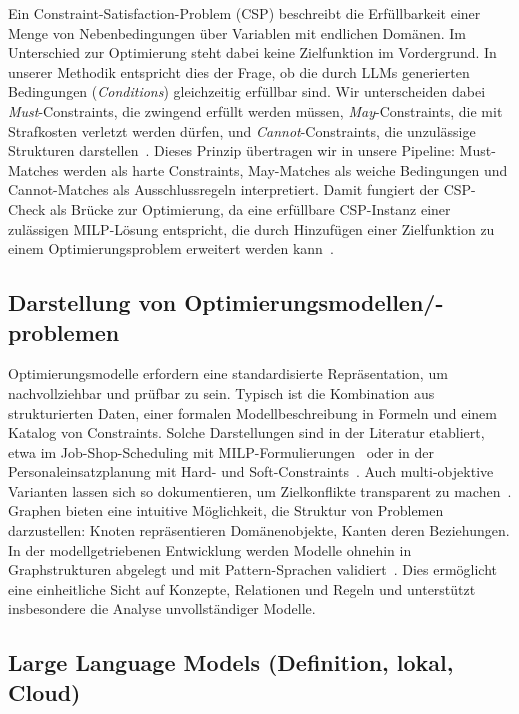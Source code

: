 \documentclass[runningheads]{llncs}
\begin{document}
Ein Constraint-Satisfaction-Problem (CSP) beschreibt die Erfüllbarkeit einer Menge von Nebenbedingungen über Variablen mit endlichen Domänen. Im Unterschied zur Optimierung steht dabei keine Zielfunktion im Vordergrund. In unserer Methodik entspricht dies der Frage, ob die durch LLMs generierten Bedingungen (\emph{Conditions}) gleichzeitig erfüllbar sind. Wir unterscheiden dabei \emph{Must}-Constraints, die zwingend erfüllt werden müssen, \emph{May}-Constraints, die mit Strafkosten verletzt werden dürfen, und \emph{Cannot}-Constraints, die unzulässige Strukturen darstellen~\cite{ref_article2}. Dieses Prinzip übertragen wir in unsere Pipeline: Must-Matches werden als harte Constraints, May-Matches als weiche Bedingungen und Cannot-Matches als Ausschlussregeln interpretiert. Damit fungiert der CSP-Check als Brücke zur Optimierung, da eine erfüllbare CSP-Instanz einer zulässigen MILP-Lösung entspricht, die durch Hinzufügen einer Zielfunktion zu einem Optimierungsproblem erweitert werden kann~\cite{ref_article3}.

\subsection{Darstellung von Optimierungsmodellen/-problemen}

Optimierungsmodelle erfordern eine standardisierte Repräsentation, um nachvollziehbar und prüfbar zu sein. Typisch ist die Kombination aus strukturierten Daten, einer formalen Modellbeschreibung in Formeln und einem Katalog von Constraints. Solche Darstellungen sind in der Literatur etabliert, etwa im Job-Shop-Scheduling mit MILP-Formulierungen~\cite{ref_article3} oder in der Personaleinsatzplanung mit Hard- und Soft-Constraints~\cite{ref_article2}. Auch multi-objektive Varianten lassen sich so dokumentieren, um Zielkonflikte transparent zu machen~\cite{ref_article1}. Graphen bieten eine intuitive Möglichkeit, die Struktur von Problemen darzustellen: Knoten repräsentieren Domänenobjekte, Kanten deren Beziehungen. In der modellgetriebenen Entwicklung werden Modelle ohnehin in Graphstrukturen abgelegt und mit Pattern-Sprachen validiert~\cite{ref_article6}. Dies ermöglicht eine einheitliche Sicht auf Konzepte, Relationen und Regeln und unterstützt insbesondere die Analyse unvollständiger Modelle.

\subsection{Large Language Models (Definition, lokal, Cloud)}
\end{document}
